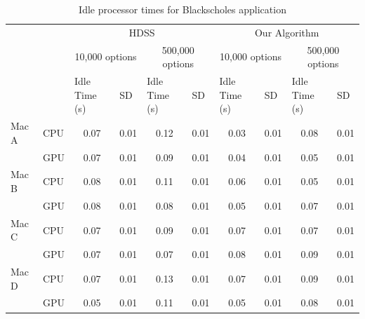 \documentclass[journal]{IEEEtran}
\begin{document}
\begin{table}[htb]
\centering
\caption{Idle processor times for Blackscholes application}
\begin{scriptsize}
\begin{tabular}{|l|l|l|l|l|l|l|l|l|l|}
\cline{3-10}
\multicolumn{1}{l}{} &  & \multicolumn{4}{c|}{HDSS} & \multicolumn{4}{c|}{Our Algorithm} \\ 
\cline{3-10}
\multicolumn{1}{l}{} &  & \multicolumn{2}{c|}{10,000 options} & \multicolumn{2}{c|}{500,000 options} & \multicolumn{2}{c|}{10,000 options} & \multicolumn{2}{c|}{500,000 options} \\ 
\cline{3-10}
\multicolumn{1}{l}{} &  & Idle Time (s) & SD & Idle Time (s) & SD & Idle Time (s) & SD & Idle Time (s) & SD \\ 
\hline
Mac A & CPU & \multicolumn{1}{c|}{0.07} & \multicolumn{1}{c|}{0.01} & \multicolumn{1}{c|}{0.12} & \multicolumn{1}{c|}{0.01} & \multicolumn{1}{c|}{0.03} & \multicolumn{1}{c|}{0.01} & \multicolumn{1}{c|}{0.08} & \multicolumn{1}{c|}{0.01} \\ 
\cline{2-10}
 & GPU & \multicolumn{1}{c|}{0.07} & \multicolumn{1}{c|}{0.01} & \multicolumn{1}{c|}{0.09} & \multicolumn{1}{c|}{0.01} & \multicolumn{1}{c|}{0.04} & \multicolumn{1}{c|}{0.01} & \multicolumn{1}{c|}{0.05} & \multicolumn{1}{c|}{0.01} \\ 
\hline
Mac B & CPU & \multicolumn{1}{c|}{0.08} & \multicolumn{1}{c|}{0.01} & \multicolumn{1}{c|}{0.11} & \multicolumn{1}{c|}{0.01} & \multicolumn{1}{c|}{0.06} & \multicolumn{1}{c|}{0.01} & \multicolumn{1}{c|}{0.05} & \multicolumn{1}{c|}{0.01} \\ 
\cline{2-10}
 & GPU & \multicolumn{1}{c|}{0.08} & \multicolumn{1}{c|}{0.01} & \multicolumn{1}{c|}{0.08} & \multicolumn{1}{c|}{0.01} & \multicolumn{1}{c|}{0.05} & \multicolumn{1}{c|}{0.01} & \multicolumn{1}{c|}{0.07} & \multicolumn{1}{c|}{0.01} \\ 
\hline
Mac C & CPU & \multicolumn{1}{c|}{0.07} & \multicolumn{1}{c|}{0.01} & \multicolumn{1}{c|}{0.09} & \multicolumn{1}{c|}{0.01} & \multicolumn{1}{c|}{0.07} & \multicolumn{1}{c|}{0.01} & \multicolumn{1}{c|}{0.07} & \multicolumn{1}{c|}{0.01} \\ 
\cline{2-10}
 & GPU & \multicolumn{1}{c|}{0.07} & \multicolumn{1}{c|}{0.01} & \multicolumn{1}{c|}{0.07} & \multicolumn{1}{c|}{0.01} & \multicolumn{1}{c|}{0.08} & \multicolumn{1}{c|}{0.01} & \multicolumn{1}{c|}{0.09} & \multicolumn{1}{c|}{0.01} \\ 
\hline
Mac D & CPU & \multicolumn{1}{c|}{0.07} & \multicolumn{1}{c|}{0.01} & \multicolumn{1}{c|}{0.13} & \multicolumn{1}{c|}{0.01} & \multicolumn{1}{c|}{0.07} & \multicolumn{1}{c|}{0.01} & \multicolumn{1}{c|}{0.09} & \multicolumn{1}{c|}{0.01} \\ 
\cline{2-10}
 & GPU & \multicolumn{1}{c|}{0.05} & \multicolumn{1}{c|}{0.01} & \multicolumn{1}{c|}{0.11} & \multicolumn{1}{c|}{0.01} & \multicolumn{1}{c|}{0.05} & \multicolumn{1}{c|}{0.01} & \multicolumn{1}{c|}{0.08} & \multicolumn{1}{c|}{0.01} \\ 
\hline
\end{tabular}
\end{scriptsize}
\label{table: ociosidadeBlack}
\end{table}
\end{document}
